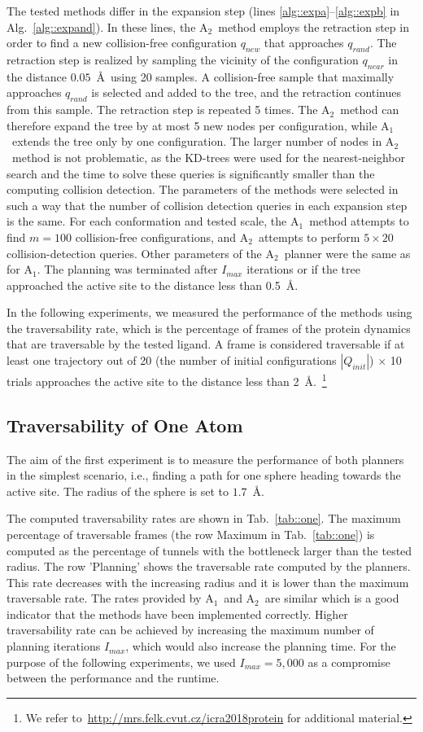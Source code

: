 \documentclass[usletter, 10pt, conference]{ieeeconf} %
\def\qrand{q_{rand}}
\def\qnear{q_{near}}
\def\qnew{q_{new}}
\def\QI{Q_{init}}
\def\Imax{I_{max}} %
\def\RA{A$_{1}$}
\def\RB{A$_{2}$}
\begin{document}
The tested methods differ in the expansion step (lines \ref{alg::expa}--\ref{alg::expb} in Alg.~\ref{alg::expand}).
In these lines, the \RB\ method employs the retraction step in order to find a new collision-free configuration $\qnew$ that approaches $\qrand$.
The retraction step is realized by sampling the vicinity of the configuration $\qnear$ in the distance $0.05$~\AA\ using 20 samples.
A collision-free sample that maximally approaches $\qrand$ is selected and added to the tree, and the retraction continues from this sample.
The retraction step is repeated 5 times.
The \RB\ method can therefore expand the tree by at most 5 new nodes per configuration, while \RA\ extends the tree only by one configuration.
The larger number of nodes in \RB\ method is not problematic, as the KD-trees were used for the nearest-neighbor search and the time to solve these queries is significantly smaller than the computing collision detection.
The parameters of the methods were selected in such a way that the number of collision detection queries in each expansion step is the same.
For each conformation and tested scale, the \RA\ method attempts to find $m=100$ collision-free configurations, and \RB\ attempts to perform $5 \times 20$ collision-detection queries.
Other parameters of the \RB\ planner were the same as for \RA.
The planning was terminated after $\Imax$ iterations or if the tree approached the active site to the distance less than 0.5~\AA.

In the following experiments, we measured the performance of the methods using the traversability rate, which is the percentage of frames of the protein dynamics that are traversable by the tested ligand.
A frame is considered traversable if at least one trajectory out of 20 (the number of initial configurations $|\QI|$) $\times$ 10 trials approaches the active site to the distance less than 2~\AA.~\footnote{We refer to~\url{http://mrs.felk.cvut.cz/icra2018protein} for additional material.}

\subsection{Traversability of One Atom}

The aim of the first experiment is to measure the performance of both planners in the simplest scenario, i.e., finding a path for one sphere heading towards the active site.
The radius of the sphere is set to $1.7$~\AA. 

The computed traversability rates are shown in Tab.~\ref{tab::one}.
The maximum percentage of traversable frames (the row Maximum in Tab.~\ref{tab::one}) is computed as the percentage of tunnels with the bottleneck larger than the tested radius.
The row 'Planning' shows the traversable rate computed by the planners.
This rate decreases with the increasing radius and it is lower than the maximum traversable rate.
The rates provided by \RA\ and \RB\ are similar which is a good indicator that the methods have been implemented correctly.
Higher traversability rate can be achieved by increasing the maximum number of planning iterations $\Imax$, which would also
increase the planning time.
For the purpose of the following experiments, we used $\Imax=5,000$ as a compromise between the performance and the runtime.
\end{document}
